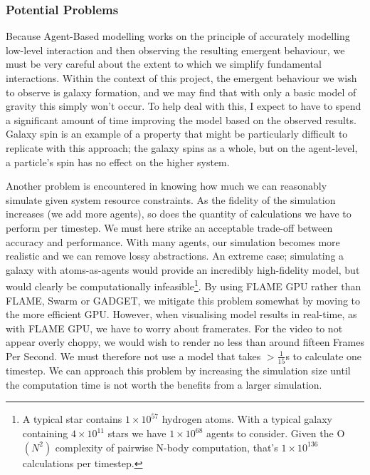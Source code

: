 \documentclass[11pt,a4paper]{article}
\begin{document}
\subsubsection{Potential Problems}
Because Agent-Based modelling works on the principle of accurately modelling low-level interaction and then observing the resulting emergent behaviour, we must be very careful about the extent to which we simplify fundamental interactions. Within the context of this project, the emergent behaviour we wish to observe is galaxy formation, and we may find that with only a basic model of gravity this simply won't occur. To help deal with this, I expect to have to spend a significant amount of time improving the model based on the observed results. Galaxy spin is an example of a property that might be particularly difficult to replicate with this approach; the galaxy spins as a whole, but on the agent-level, a particle's spin has no effect on the higher system.

Another problem is encountered in knowing how much we can reasonably simulate given system resource constraints. As the fidelity of the simulation increases (we add more agents), so does the quantity of calculations we have to perform per timestep. We must here strike an acceptable trade-off between accuracy and performance. With many agents, our simulation becomes more realistic and we can remove lossy abstractions. An extreme case; simulating a galaxy with atoms-as-agents would provide an incredibly high-fidelity model, but would clearly be computationally infeasible\footnote{A typical star contains $1\times10^{57}$ hydrogen atoms. With a typical galaxy containing $4\times10^{11}$ stars we have $1\times10^{68}$ agents to consider. Given the O$(N^2)$ complexity of pairwise N-body computation, that's $1\times10^{136}$ calculations per timestep.}. By using FLAME GPU rather than FLAME, Swarm or GADGET, we mitigate this problem somewhat by moving to the more efficient GPU. However, when visualising model results in real-time, as with FLAME GPU, we have to worry about framerates. For the video to not appear overly choppy, we would wish to render no less than around fifteen Frames Per Second. We must therefore not use a model that takes $>\frac{1}{15}$s to calculate one timestep. We can approach this problem by increasing the simulation size until the computation time is not worth the benefits from a larger simulation.
\end{document}
